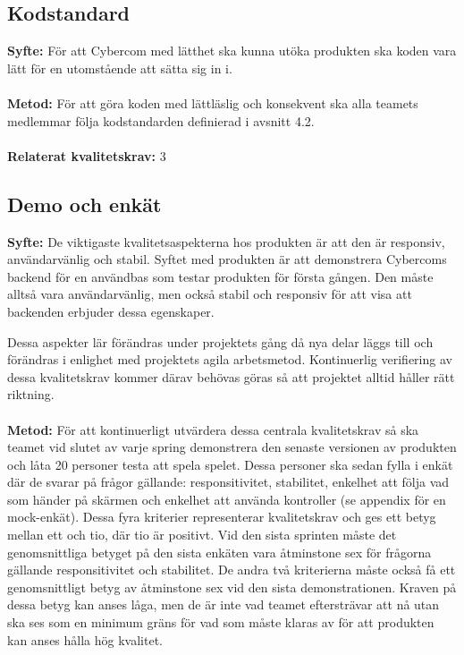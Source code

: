 \documentclass[10pt]{article}
\begin{document}
	\subsection{Kodstandard}
	\textbf{Syfte:} För att Cybercom med lätthet ska kunna utöka produkten ska koden vara lätt för en utomstående att sätta sig in i.
	\\\\
	\textbf{Metod:} För att göra koden med lättläslig och konsekvent ska alla teamets medlemmar följa kodstandarden definierad i avsnitt 4.2.
	\\\\
	\textbf{Relaterat kvalitetskrav:} 3
	\\
	
	\subsection{Demo och enkät}
	\textbf{Syfte:} De viktigaste kvalitetsaspekterna hos produkten är att den är responsiv, användarvänlig och stabil. Syftet med produkten är att demonstrera Cybercoms backend för en användbas som testar produkten för första gången. Den måste alltså vara användarvänlig, men också stabil och responsiv för att visa att backenden erbjuder dessa egenskaper.
	
	Dessa aspekter lär förändras under projektets gång då nya delar läggs till och förändras i enlighet med projektets agila arbetsmetod. Kontinuerlig verifiering av dessa kvalitetskrav kommer därav behövas göras så att projektet alltid håller rätt riktning.
	\\\\
	\textbf{Metod:} För att kontinuerligt utvärdera dessa centrala kvalitetskrav så ska teamet vid slutet av varje spring demonstrera den senaste versionen av produkten och låta 20 personer testa att spela spelet. Dessa personer ska sedan fylla i enkät där de svarar på frågor gällande: responsitivitet, stabilitet, enkelhet att följa vad som händer på skärmen och enkelhet att använda kontroller (se appendix för en mock-enkät). Dessa fyra kriterier representerar kvalitetskrav och ges ett betyg mellan ett och tio, där tio är positivt. Vid den sista sprinten måste det genomsnittliga betyget på den sista enkäten vara åtminstone sex för frågorna gällande responsitivitet och stabilitet. De andra två kriterierna måste också få ett genomsnittligt betyg av åtminstone sex vid den sista demonstrationen. Kraven på dessa betyg kan anses låga, men de är inte vad teamet eftersträvar att nå utan ska ses som en minimum gräns för vad som måste klaras av för att produkten kan anses hålla hög kvalitet.
	
\end{document}
